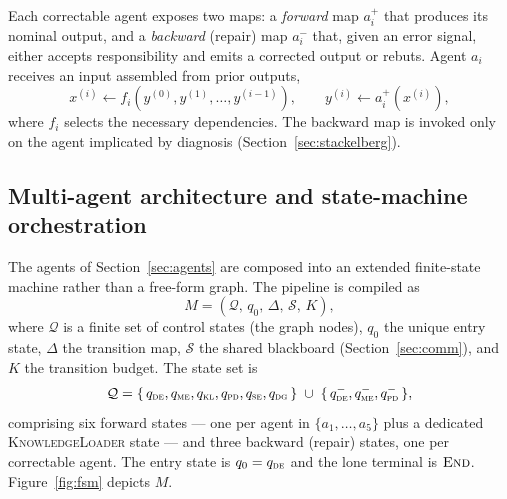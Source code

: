 \documentclass[a4paper,fleqn]{cas-sc}
\newcommand{\Qcal}{\mathcal{Q}}
\newcommand{\Scal}{\mathcal{S}}
\begin{document}
Each correctable agent exposes two maps: a \emph{forward} map $a_i^{+}$ that
produces its nominal output, and a \emph{backward} (repair) map $a_i^{-}$ that,
given an error signal, either accepts responsibility and emits a corrected
output or rebuts. Agent $a_i$ receives an input assembled from prior outputs,
\begin{equation}\label{eq:forward}
x^{(i)}\gets f_i(y^{(0)},y^{(1)},\dots,y^{(i-1)}),\qquad
y^{(i)}\gets a_i^{+}(x^{(i)}),
\end{equation}
where $f_i$ selects the necessary dependencies. The backward map is invoked
only on the agent implicated by diagnosis (Section~\ref{sec:stackelberg}).

\subsection{Multi-agent architecture and state-machine orchestration}
\label{sec:architecture}

The agents of Section~\ref{sec:agents} are composed into an extended
finite-state machine rather than a free-form graph. The pipeline is compiled as
\begin{equation}\label{eq:fsm}
M=(\Qcal,\,q_0,\,\Delta,\,\Scal,\,K),
\end{equation}
where $\Qcal$ is a finite set of control states (the graph nodes), $q_0$ the
unique entry state, $\Delta$ the transition map, $\Scal$ the shared blackboard
(Section~\ref{sec:comm}), and $K$ the transition budget. The state set is
\begin{equation}
\Qcal=\{\,q_{\textsc{de}},q_{\textsc{me}},q_{\textsc{kl}},q_{\textsc{pd}},
q_{\textsc{se}},q_{\textsc{dg}}\,\}\;\cup\;\{\,q_{\textsc{de}}^{-},
q_{\textsc{me}}^{-},q_{\textsc{pd}}^{-}\,\},
\end{equation}
comprising six forward states --- one per agent in $\{a_1,\dots,a_5\}$ plus a
dedicated \textsc{KnowledgeLoader} state --- and three backward (repair)
states, one per correctable agent. The entry state is $q_0=q_{\textsc{de}}$ and
the lone terminal is $\textsc{End}$. Figure~\ref{fig:fsm} depicts $M$.
\end{document}
